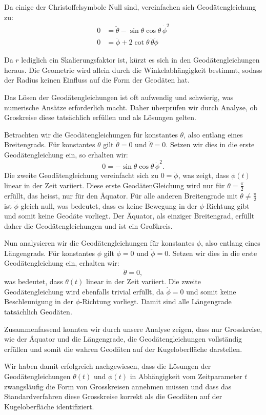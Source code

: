 Da einige der Christoffelsymbole Null sind, vereinfachen sich Geodätengleichung zu:
\begin{equation}
	\begin{align}
		0 &= \ddot{\theta} - \sin\theta \cos\theta \, \dot{\phi}^2 \\
		0 &= \ddot{\phi} + 2 \cot\theta \, \dot{\theta} \dot{\phi}
	\end{align}
\end{equation}

Da $r$ lediglich ein Skalierungsfaktor ist, kürzt es sich in den Geodätengleichungen heraus. 
Die Geometrie wird allein durch die Winkelabhängigkeit bestimmt, sodass der Radius keinen Einfluss auf die Form der Geodäten hat.

Das Lösen der Geodätengleichungen ist oft aufwendig und schwierig, was numerische Ansätze erforderlich macht. 
Daher überprüfen wir durch Analyse, ob Groskreise diese tatsächlich erfüllen und als Lösungen gelten.

Betrachten wir die Geodätengleichungen für konstantes $\theta$, also entlang eines Breitengrads.
Für konstantes $\theta$ gilt $\dot{\theta} = 0$ und $\ddot{\theta} = 0$.
Setzen wir dies in die erste Geodätengleichung ein, so erhalten wir:
\begin{equation}
	0 = -\sin\theta \cos\theta \, \dot{\phi}^2.
\end{equation}
Die zweite Geodätengleichung vereinfacht sich zu $0 = \ddot{\phi}$, was zeigt, dass $\phi(t)$ linear in der Zeit variiert.
Diese erste GeodätenGleichung wird nur für $\theta = \frac{\pi}{2}$ erfüllt, das heisst, nur für den Äquator.
Für alle anderen Breitengrade mit $\theta \neq \frac{\pi}{2}$ ist $\dot{\phi}$ gleich null, was bedeutet, dass es keine Bewegung in der $\phi$-Richtung gibt und somit keine Geodäte vorliegt.
Der Äquator, als einziger Breitengrad, erfüllt daher die Geodätengleichungen und ist ein Großkreis.

Nun analysieren wir die Geodätengleichungen für konstantes $\phi$, also entlang eines Längengrads.
Für konstantes $\phi$ gilt $\dot{\phi} = 0$ und $\ddot{\phi} = 0$.
Setzen wir dies in die erste Geodätengleichung ein, erhalten wir:
\begin{equation}
	\ddot{\theta} = 0,
\end{equation}
was bedeutet, dass $\theta(t)$ linear in der Zeit variiert.
Die zweite Geodätengleichung wird ebenfalls trivial erfüllt, da $\dot{\phi} = 0$ und somit keine Beschleunigung in der $\phi$-Richtung vorliegt.
Damit sind alle Längengrade tatsächlich Geodäten.

Zusammenfassend konnten wir durch unsere Analyse zeigen, dass nur Grosskreise, wie der Äquator und die Längengrade, die Geodätengleichungen vollständig erfüllen und somit die wahren Geodäten auf der Kugeloberfläche darstellen.

Wir haben damit erfolgreich nachgewiesen, dass die Lösungen der Geodätengleichungen $\theta(t)$ und $\phi(t)$ in Abhängigkeit vom Zeitparameter $t$ zwangsläufig die Form von Grosskreisen annehmen müssen und dass das Standardverfahren diese Grosskreise korrekt als die Geodäten auf der Kugeloberfläche identifiziert.


